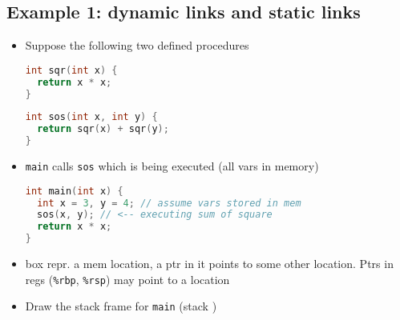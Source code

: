 \documentclass[10pt,a4paper,landscape]{article}
\begin{document}
\begin{multicols*}{3}
\section*{Example 1: dynamic links and static links}
\begin{itemize}
\item Suppose the following two  defined procedures
\begin{minipage}{.5\linewidth}
\begin{lstlisting}[language=c]
int sqr(int x) {
  return x * x;
}
\end{lstlisting}
\end{minipage}
\begin{minipage}{.5\linewidth}
\begin{lstlisting}[language=c,xleftmargin=2pt]
int sos(int x, int y) {
  return sqr(x) + sqr(y);
}
\end{lstlisting}
\end{minipage}
\item \texttt{main} calls \texttt{sos} which is being executed (all vars in memory)
\begin{lstlisting}[language=c]
int main(int x) {
  int x = 3, y = 4; // assume vars stored in mem
  sos(x, y); // <-- executing sum of square
  return x * x;
}
\end{lstlisting}
\item box repr. a mem location, a ptr in it points to some other location. Ptrs in regs (\texttt{\%rbp}, \texttt{\%rsp}) may point to a location
  \begin{minipage}{\linewidth}
  \end{minipage}
\item Draw the stack frame for \texttt{main} (stack )
\begin{minipage}{\linewidth}
  \centering
\end{minipage}
\end{itemize}
\end{multicols*}
\end{document}
